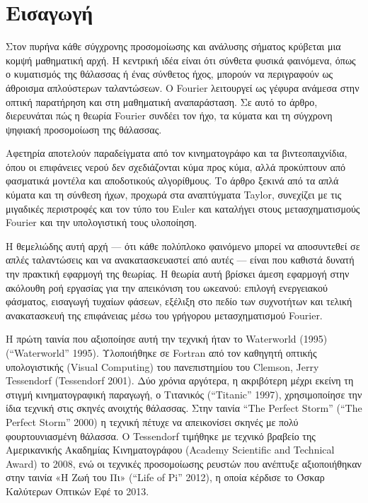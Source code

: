 \documentclass[a4paper, 11pt]{article}
\begin{document}


\section{Εισαγωγή}\label{ux3b5ux3b9ux3c3ux3b1ux3b3ux3c9ux3b3ux3ae}

Στον πυρήνα κάθε σύγχρονης προσομοίωσης και ανάλυσης σήματος κρύβεται
μια κομψή μαθηματική αρχή. Η κεντρική ιδέα είναι ότι σύνθετα φυσικά
φαινόμενα, όπως ο κυματισμός της θάλασσας ή ένας σύνθετος ήχος, μπορούν
να περιγραφούν ως άθροισμα απλούστερων ταλαντώσεων. Ο Fourier λειτουργεί
ως γέφυρα ανάμεσα στην οπτική παρατήρηση και στη μαθηματική
αναπαράσταση. Σε αυτό το άρθρο, διερευνάται πώς η θεωρία Fourier συνδέει
τον ήχο, τα κύματα και τη σύγχρονη ψηφιακή προσομοίωση της θάλασσας.

Αφετηρία αποτελούν παραδείγματα από τον κινηματογράφο και τα
βιντεοπαιχνίδια, όπου οι επιφάνειες νερού δεν σχεδιάζονται κύμα προς
κύμα, αλλά προκύπτουν από φασματικά μοντέλα και αποδοτικούς αλγορίθμους.
Το άρθρο ξεκινά από τα απλά κύματα και τη σύνθεση ήχων, προχωρά στα
αναπτύγματα Taylor, συνεχίζει με τις μιγαδικές περιστροφές και τον τύπο
του Euler και καταλήγει στους μετασχηματισμούς Fourier και την
υπολογιστική τους υλοποίηση.

Η θεμελιώδης αυτή αρχή --- ότι κάθε πολύπλοκο φαινόμενο μπορεί να
αποσυντεθεί σε απλές ταλαντώσεις και να ανακατασκευαστεί από αυτές ---
είναι που καθιστά δυνατή την πρακτική εφαρμογή της θεωρίας. Η θεωρία
αυτή βρίσκει άμεση εφαρμογή στην ακόλουθη ροή εργασίας για την
απεικόνιση του ωκεανού: επιλογή ενεργειακού φάσματος, εισαγωγή τυχαίων
φάσεων, εξέλιξη στο πεδίο των συχνοτήτων και τελική ανακατασκευή της
επιφάνειας μέσω του γρήγορου μετασχηματισμού Fourier.

Η πρώτη ταινία που αξιοποίησε αυτή την τεχνική ήταν το Waterworld (1995)
({``Waterworld''} 1995). Υλοποιήθηκε σε Fortran από τον καθηγητή οπτικής
υπολογιστικής (Visual Computing) του πανεπιστημίου του Clemson, Jerry
Tessendorf (Tessendorf 2001). Δύο χρόνια αργότερα, η ακριβότερη μέχρι
εκείνη τη στιγμή κινηματογραφική παραγωγή, ο Τιτανικός ({``Titanic''}
1997), χρησιμοποίησε την ίδια τεχνική στις σκηνές ανοιχτής θάλασσας.
Στην ταινία ``The Perfect Storm'' ({``The Perfect Storm''} 2000) η
τεχνική πέτυχε να απεικονίσει σκηνές με πολύ φουρτουνιασμένη θάλασσα. Ο
Tessendorf τιμήθηκε με τεχνικό βραβείο της Αμερικανικής Ακαδημίας
Κινηματογράφου (Academy Scientific and Technical Award) το 2008, ενώ οι
τεχνικές προσομοίωσης ρευστών που ανέπτυξε αξιοποιήθηκαν στην ταινία «Η
Ζωή του Πι» ({``Life of Pi''} 2012), η οποία κέρδισε το Όσκαρ Καλύτερων
Οπτικών Εφέ το 2013.
\end{document}

